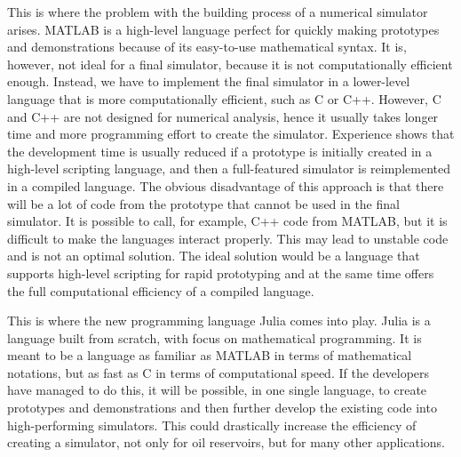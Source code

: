 This is where the problem with the building process of a numerical simulator arises. MATLAB is a high-level language perfect for quickly making prototypes and demonstrations because of its easy-to-use mathematical syntax. It is, however, not ideal for a final simulator, because it is not computationally efficient enough. Instead, we have to implement the final simulator in a lower-level language that is more computationally efficient, such as C or C++. However, C and C++ are not designed for numerical analysis, hence it usually takes longer time and more programming effort to create the simulator. Experience shows that the development time is usually reduced if a prototype is initially created in a high-level scripting language, and then a full-featured simulator is reimplemented in a compiled language. The obvious disadvantage of this approach is that there will be a lot of code from the prototype that cannot be used in the final simulator. It is possible to call, for example, C++ code from MATLAB, but it is difficult to make the languages interact properly. This may lead to unstable code and is not an optimal solution. The ideal solution would be a language that supports high-level scripting for rapid prototyping and at the same time offers the full computational efficiency of a compiled language.

This is where the new programming language Julia comes into play. Julia is a language built from scratch, with focus on mathematical programming. It is meant to be a language as familiar as MATLAB in terms of mathematical notations, but as fast as C in terms of computational speed. If the developers have managed to do this, it will be possible, in one single language, to create prototypes and demonstrations and then further develop the existing code into high-performing simulators. This could drastically increase the efficiency of creating a simulator, not only for oil reservoirs, but for many other applications. 

